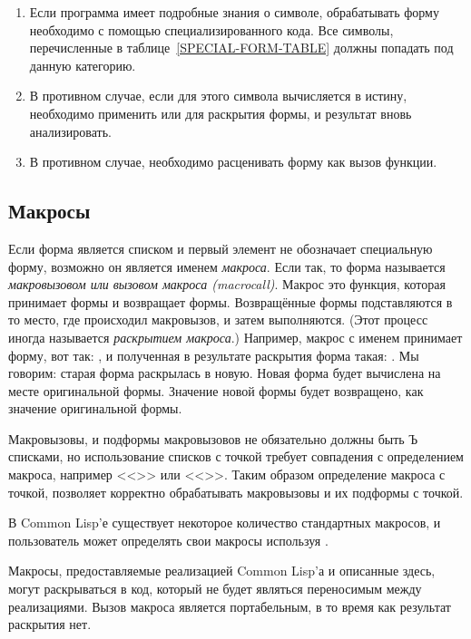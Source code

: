 \begin{enumerate}
\item
  Если программа имеет подробные знания о символе, обрабатывать форму необходимо с
  помощью специализированного кода. Все символы, перечисленные в
  таблице~\ref{SPECIAL-FORM-TABLE} должны попадать под данную категорию.

\item
  В противном случае, если для этого символа  вычисляется в
  истину, необходимо применить  или  для раскрытия
  формы, и результат вновь анализировать.

\item
  В противном случае, необходимо расценивать форму как вызов функции.
\end{enumerate}

\subsection{Макросы}

Если форма является списком и первый элемент не обозначает специальную
форму, возможно он является именем \emph{макроса}. Если так, то форма
называется \emph{макровызовом или вызовом макроса (macrocall)}. Макрос
это функция, которая принимает формы и возвращает формы. Возвращённые формы
подставляются в то место, где происходил макровызов, и затем выполняются. (Этот
процесс иногда называется \emph{раскрытием макроса}.)
Например, макрос с именем  принимает форму, вот так: ,
и полученная в результате раскрытия форма такая: . Мы
говорим: старая форма раскрылась в новую. Новая форма будет вычислена на месте
оригинальной формы. Значение новой формы будет возвращено, как значение
оригинальной формы.

Макровызовы, и подформы макровызовов не обязательно должны быть Ъ списками, но
использование списков с точкой требует совпадения с определением макроса,
например <<>> или <<>>.
Таким образом определение макроса с точкой, позволяет корректно обрабатывать
макровызовы и их подформы с точкой.

В Common Lisp'е существует некоторое количество стандартных макросов, и
пользователь может определять свои макросы используя .

Макросы, предоставляемые реализацией Common Lisp'а и описанные здесь, могут
раскрываться в код, который не будет являться переносимым между реализациями.
Вызов макроса является портабельным, в то время как результат раскрытия нет.

